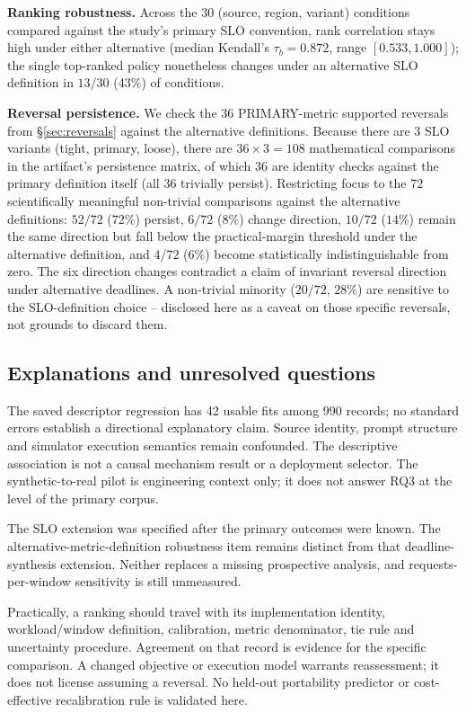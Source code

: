 \textbf{Ranking robustness.} Across the $30$ (source, region, variant)
conditions compared against the study's primary SLO convention, rank
correlation stays high under either alternative (median Kendall's
$\tau_b = 0.872$, range $[0.533, 1.000]$); the single top-ranked policy
nonetheless changes under an alternative SLO definition in $13/30$ ($43\%$)
of conditions.

\textbf{Reversal persistence.} We check the 36 PRIMARY-metric supported reversals from \S\ref{sec:reversals} against the alternative definitions. Because there are 3 SLO variants (tight, primary, loose), there are $36 \times 3 = 108$ mathematical comparisons in the artifact's persistence matrix, of which $36$ are identity checks against the primary definition itself (all 36 trivially persist). Restricting focus to the $72$ scientifically meaningful non-trivial comparisons against the alternative definitions: $52/72$ ($72\%$) persist, $6/72$ ($8\%$) change direction, $10/72$ ($14\%$) remain the same direction but fall below the practical-margin threshold under the alternative definition, and $4/72$ ($6\%$) become statistically indistinguishable from zero. The six direction changes contradict a claim of invariant reversal direction under alternative deadlines. A non-trivial minority ($20/72$, $28\%$) are sensitive to the SLO-definition
choice -- disclosed here as a caveat on those specific reversals, not
grounds to discard them.


\subsection{Explanations and unresolved questions}\label{sec:telemetry-explanation}\label{sec:results-rq3-pilot}\label{sec:slo-sensitivity-gap}
The saved descriptor regression has 42 usable fits among 990 records;
no standard errors establish a directional explanatory claim. Source
identity, prompt structure and simulator execution semantics remain
confounded. The descriptive association is not a causal mechanism result
or a deployment selector. The synthetic-to-real pilot is engineering
context only; it does not answer RQ3 at the level of the primary corpus.

The SLO extension was specified after the primary outcomes were known.
The alternative-metric-definition robustness item remains distinct from
that deadline-synthesis extension. Neither replaces a missing prospective
analysis, and requests-per-window sensitivity is still unmeasured.

Practically, a ranking should travel with its implementation identity,
workload/window definition, calibration, metric denominator, tie rule and
uncertainty procedure. Agreement on that record is evidence for the
specific comparison. A changed objective or execution model warrants
reassessment; it does not license assuming a reversal. No held-out
portability predictor or cost-effective recalibration rule is validated here.
